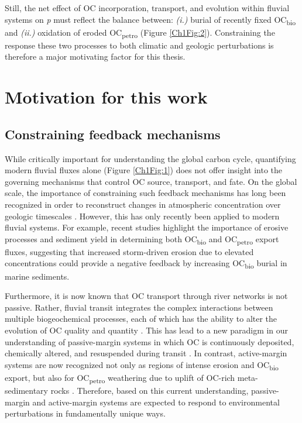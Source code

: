 Still, the net effect of OC incorporation, transport, and evolution within fluvial systems on \textit{p} must reflect the balance between: \textit{(i.)} burial of recently fixed OC\textsubscript{bio} and \textit{(ii.)} oxidation of eroded OC\textsubscript{petro} (Figure \ref{Ch1Fig:2}). Constraining the response these two processes to both climatic and geologic perturbations is therefore a major motivating factor for this thesis.

\section{Motivation for this work}

\subsection{Constraining feedback mechanisms}

While critically important for understanding the global carbon cycle, quantifying modern fluvial fluxes alone (Figure \ref{Ch1Fig:1}) does not offer insight into the governing mechanisms that control OC source, transport, and fate. On the global scale, the importance of constraining such feedback mechanisms has long been recognized in order to reconstruct changes in atmospheric  concentration over geologic timescales \citep{Berner:1999wj}. However, this has only recently been applied to modern fluvial systems. For example, recent studies \citep[\textit{e.g.}][]{Hilton:2008fo,Hilton:2012dt,Galy:2015fx} highlight the importance of erosive processes and sediment yield in determining both OC\textsubscript{bio} and OC\textsubscript{petro} export fluxes, suggesting that increased storm-driven erosion due to elevated  concentrations could provide a negative feedback by increasing OC\textsubscript{bio} burial in marine sediments.

Furthermore, it is now known that OC transport through river networks is not passive. Rather, fluvial transit integrates the complex interactions between multiple biogeochemical processes, each of which has the ability to alter the evolution of OC quality and quantity \citep{Cole:2007gp,Aufdenkampe:2011fm,Bianchi:2011cu}. This has lead to a new paradigm in our understanding of passive-margin systems in which OC is continuously deposited, chemically altered, and resuspended during transit \citep[the so-called "river continuum"; Figure \ref{Ch1Fig:3};][]{Blair:2012du}. In contrast, active-margin systems are now recognized not only as regions of intense erosion and OC\textsubscript{bio} export, but also for OC\textsubscript{petro} weathering due to uplift of OC-rich meta-sedimentary rocks \citep[Figure \ref{Ch1Fig:3};][]{Milliman:1992fu}. Therefore, based on this current understanding, passive-margin and active-margin systems are expected to respond to environmental perturbations in fundamentally unique ways.

